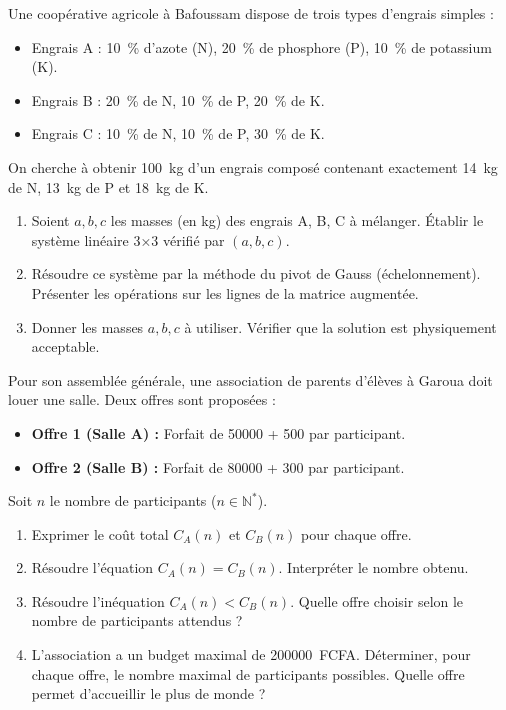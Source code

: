 \documentclass[11pt]{article}
\begin{document}
\begin{exercice}
Une coopérative agricole à Bafoussam dispose de trois types d'engrais simples :
\begin{itemize}
    \item Engrais A : \SI{10}{\%} d'azote (N), \SI{20}{\%} de phosphore (P), \SI{10}{\%} de potassium (K).
    \item Engrais B : \SI{20}{\%} de N, \SI{10}{\%} de P, \SI{20}{\%} de K.
    \item Engrais C : \SI{10}{\%} de N, \SI{10}{\%} de P, \SI{30}{\%} de K.
\end{itemize}
On cherche à obtenir \SI{100}{\kilo\gram} d'un engrais composé contenant exactement \SI{14}{\kilo\gram} de N, \SI{13}{\kilo\gram} de P et \SI{18}{\kilo\gram} de K.
\begin{enumerate}
    \item Soient $a, b, c$ les masses (en kg) des engrais A, B, C à mélanger. Établir le système linéaire 3×3 vérifié par $(a, b, c)$.
    \item Résoudre ce système par la méthode du pivot de Gauss (échelonnement). Présenter les opérations sur les lignes de la matrice augmentée.
    \item Donner les masses $a, b, c$ à utiliser. Vérifier que la solution est physiquement acceptable.
\end{enumerate}
\end{exercice}

\begin{exercice}
Pour son assemblée générale, une association de parents d'élèves à Garoua doit louer une salle. Deux offres sont proposées :
\begin{itemize}
    \item \textbf{Offre 1 (Salle A) :} Forfait de \SI{50000}{} + \SI{500}{} par participant.
    \item \textbf{Offre 2 (Salle B) :} Forfait de \SI{80000}{} + \SI{300}{} par participant.
\end{itemize}
Soit $n$ le nombre de participants ($n \in \mathbb{N}^*$).
\begin{enumerate}
    \item Exprimer le coût total $C_A(n)$ et $C_B(n)$ pour chaque offre.
    \item Résoudre l'équation $C_A(n) = C_B(n)$. Interpréter le nombre obtenu.
    \item Résoudre l'inéquation $C_A(n) < C_B(n)$. Quelle offre choisir selon le nombre de participants attendus ?
    \item L'association a un budget maximal de \num{200000}~FCFA. Déterminer, pour chaque offre, le nombre maximal de participants possibles. Quelle offre permet d'accueillir le plus de monde ?
\end{enumerate}
\end{exercice}
\end{document}
